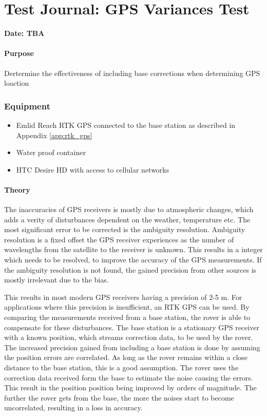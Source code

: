 \chapter{Test Journal: GPS Variances Test} \label{app:GPSImprovement}

\textbf{Date: TBA}

\subsubsection*{Purpose}
Dertermine the effectiveness of including base corrections when determining GPS loaction
\subsection*{Equipment}
\begin{itemize}
	\item Emlid Reach RTK GPS connected to the base station as described in Appendix \ref{app:rtk_gps}
    \item Water proof container
    \item HTC Desire HD with access to cellular networks
\end{itemize}

\subsubsection*{Theory}\cite{novatel}\cite{RTK_GPS}\cite{GPS_errors}\cite{ambg_res}

The inaccuracies of GPS receivers is mostly due to atmospheric changes, which adds a verity of disturbances dependent on the weather, temperature etc.
The most significant error to be corrected is the ambiguity resolution. 
Ambiguity resolution is a fixed offset the GPS receiver experiences as the number of wavelengths from the satellite to the receiver is unknown. 
This results in a integer which needs to be resolved, to improve the accuracy of the GPS measurements. 
If the ambiguity resolution is not found, the gained precision from other sources is mostly irrelevant due to the bias. 

This results in most modern GPS receivers having a precision of 2-5 m. 
For applications where this precision is insufficient, an RTK GPS can be used. 
By comparing the measurements received from a base station, the rover is able to compensate for these disturbances.
The base station is a stationary GPS receiver with a known position, which streams correction data, to be used by the rover. 
The increased precision gained from including a base station is done by assuming the position errors are correlated. 
As long as the rover remains within a close distance to the base station, this is a good assumption. 
The rover uses the correction data received form the base to estimate the noise causing the errors. 
This result in the position position being improved by orders of magnitude. 
The further the rover gets from the base, the more the noises start to become uncorrelated, resulting in a loss in accuracy. 

